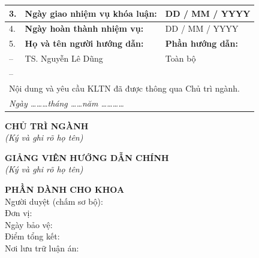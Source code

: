 \documentclass[13pt,a4paper,oneside]{extbook}
\begin{document}
{\begin{tabular}{|p{}|p{}|p{}|p{}|p{}|}
\hline
3. & \multicolumn{2}{l|}{\textbf{Ngày giao nhiệm vụ khóa luận:}} &
\multicolumn{2}{l|}{DD / MM / YYYY} \\
\hline
4. & \multicolumn{2}{l|}{\textbf{Ngày hoàn thành nhiệm vụ:}} &
\multicolumn{2}{l|}{DD / MM / YYYY} \\
\hline
5. & \multicolumn{3}{l|}{\textbf{Họ và tên người hướng dẫn:}} &
\textbf{Phần hướng dẫn:} \\
-- & \multicolumn{3}{l|}{TS. Nguyễn Lê Dũng} & Toàn bộ \\
-- & \multicolumn{3}{l|}{} & \\
\hline
\multicolumn{5}{|l|}{Nội dung và yêu cầu KLTN đã được thông qua Chủ trì ngành.} \\
\multicolumn{5}{|l|}{\textit{\hspace{1cm}Ngày \dots\dots\dots tháng \dots\dots năm \dots\dots\dots\dots}} \\
\hline
\end{tabular}
\renewcommand{\arraystretch}{1.0}}

\vspace{0.3cm}
\noindent
\begin{minipage}[t]{0.45\textwidth}
    \centering
    \textbf{CHỦ TRÌ NGÀNH} \\[0.2cm]
    \textit{(Ký và ghi rõ họ tên)}
\end{minipage}%
\hfill
\begin{minipage}[t]{0.45\textwidth}
    \centering
    \textbf{GIẢNG VIÊN HƯỚNG DẪN CHÍNH} \\[0.2cm]
    \textit{(Ký và ghi rõ họ tên)}
\end{minipage}

\vspace{2.5cm}

\noindent\textbf{PHẦN DÀNH CHO KHOA} \\[0.1cm]
Người duyệt (chấm sơ bộ): \dotfill \\
Đơn vị: \dotfill \\
Ngày bảo vệ: \dotfill \\
Điểm tổng kết: \dotfill \\
Nơi lưu trữ luận án: \dotfill

\clearpage


\frontmatter
\end{document}
